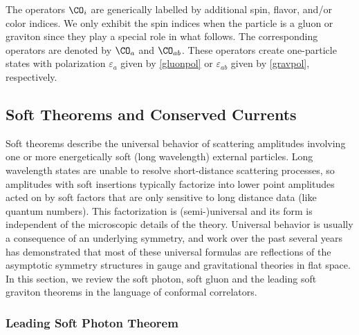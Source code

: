 \documentclass[11pt]{article}
\def\ve{{\varepsilon}}
\begin{document}
The operators $\CO_i$ are generically labelled by additional spin, flavor, and/or color indices.  We only exhibit the spin indices when the particle is a gluon or graviton since they play a special role in what follows. The corresponding operators are denoted by $\CO_a$ and $\CO_{ab}$. These operators create one-particle states with polarization $\ve_a$ given by \eqref{gluonpol} or $\ve_{ab}$ given by \eqref{gravpol}, respectively.



\subsection{Soft Theorems and Conserved Currents}
\label{sec:softthmreview}

Soft theorems describe the universal behavior of scattering amplitudes involving one or more energetically soft (long wavelength) external particles. Long wavelength states are unable to resolve short-distance scattering processes, so amplitudes with soft insertions typically factorize into lower point amplitudes acted on by soft factors that are only sensitive to long distance data (like quantum numbers). This factorization is (semi-)universal and its form is independent of the microscopic details of the theory. Universal behavior is usually a consequence of an underlying symmetry, and work over the past several years has demonstrated that most of these universal formulas are reflections of the asymptotic symmetry structures  in gauge and gravitational theories in  flat space\cite{He:2014laa,He:2014cra,Kapec:2014opa,He:2015zea,Kapec:2016jld,He:2017fsb}. In this section, we review the soft photon, soft gluon and the leading soft graviton theorems in the language of conformal correlators.



\subsubsection*{Leading Soft Photon Theorem}
\end{document}
